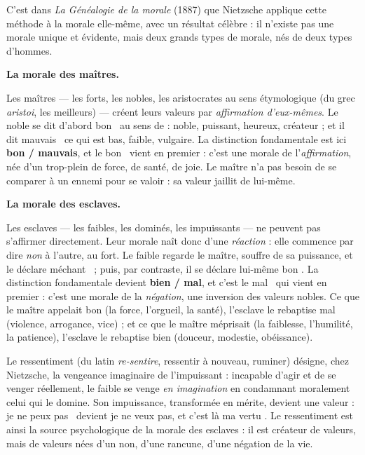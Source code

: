 \documentclass[11pt]{article}
\newcommand{\cle}[1]{{\popxbold\color{popdark}#1}}
\newcounter{popsec}
\newcounter{popsub}
\newcommand{\courssub}[1]{%
  \stepcounter{popsub}%
  \par\vspace{9pt}\noindent{\popxbold\fontsize{11.5}{13}\selectfont\color{popink}{\color{poporange}\thepopsec.\thepopsub}\hspace{6pt}#1}\par\nopagebreak\vspace{4pt}
}
\begin{document}
\courssub{Morale des maîtres et morale des esclaves}

C'est dans \emph{La Généalogie de la morale} (1887) que Nietzsche applique cette méthode à la morale elle-même, avec un résultat célèbre : il n'existe pas une morale unique et évidente, mais deux grands types de morale, nés de deux types d'hommes.

\textbf{La morale des maîtres.}\par
Les \cle{maîtres} — les forts, les nobles, les aristocrates au sens étymologique (du grec \emph{aristoi}, les meilleurs) — créent leurs valeurs par \emph{affirmation d'eux-mêmes}. Le noble se dit d'abord \guillemotleft bon \guillemotright\ au sens de : noble, puissant, heureux, créateur ; et il dit \guillemotleft mauvais \guillemotright\ ce qui est bas, faible, vulgaire. La distinction fondamentale est ici \textbf{bon / mauvais}, et le \guillemotleft bon \guillemotright\ vient en premier : c'est une morale de l'\emph{affirmation}, née d'un trop-plein de force, de santé, de joie. Le maître n'a pas besoin de se comparer à un ennemi pour se valoir : sa valeur jaillit de lui-même.

\textbf{La morale des esclaves.}\par
Les \cle{esclaves} — les faibles, les dominés, les impuissants — ne peuvent pas s'affirmer directement. Leur morale naît donc d'une \emph{réaction} : elle commence par dire \emph{non} à l'autre, au fort. Le faible regarde le maître, souffre de sa puissance, et le déclare \guillemotleft méchant \guillemotright\ ; puis, par contraste, il se déclare lui-même \guillemotleft bon \guillemotright. La distinction fondamentale devient \textbf{bien / mal}, et c'est le \guillemotleft mal \guillemotright\ qui vient en premier : c'est une morale de la \emph{négation}, une inversion des valeurs nobles. Ce que le maître appelait bon (la force, l'orgueil, la santé), l'esclave le rebaptise mal (violence, arrogance, vice) ; et ce que le maître méprisait (la faiblesse, l'humilité, la patience), l'esclave le rebaptise bien (douceur, modestie, obéissance).

\begin{definition}[Le ressentiment]
Le \cle{ressentiment} (du latin \emph{re-sentire}, ressentir à nouveau, ruminer) désigne, chez Nietzsche, la vengeance imaginaire de l'impuissant : incapable d'agir et de se venger réellement, le faible se venge \emph{en imagination} en condamnant moralement celui qui le domine. Son impuissance, transformée en mérite, devient une valeur : \guillemotleft je ne peux pas \guillemotright\ devient \guillemotleft je ne veux pas, et c'est là ma vertu \guillemotright. Le ressentiment est ainsi la source psychologique de la morale des esclaves : il est créateur de valeurs, mais de valeurs nées d'un non, d'une rancune, d'une négation de la vie.
\end{definition}
\end{document}
